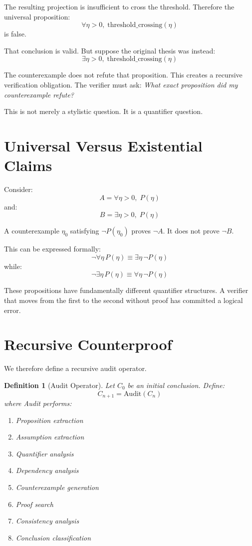 \documentclass[11pt,a4paper]{article}
\newtheorem{definition}[theorem]{Definition}
\begin{document}
The resulting projection is insufficient to cross the threshold. Therefore the universal proposition:
\[
\forall \eta > 0, \; \text{threshold\_crossing}(\eta)
\]
is false.

That conclusion is valid. But suppose the original thesis was instead:
\[
\exists \eta > 0, \; \text{threshold\_crossing}(\eta)
\]

The counterexample does not refute that proposition. This creates a recursive verification obligation. The verifier must ask: \textit{What exact proposition did my counterexample refute?}

This is not merely a stylistic question. It is a quantifier question.

\section{Universal Versus Existential Claims}

Consider:
\[
A = \forall \eta > 0, \; P(\eta)
\]
and:
\[
B = \exists \eta > 0, \; P(\eta)
\]

A counterexample $\eta_0$ satisfying $\neg P(\eta_0)$ proves $\neg A$. It does not prove $\neg B$.

This can be expressed formally:
\[
\neg \forall \eta \, P(\eta) \equiv \exists \eta \, \neg P(\eta)
\]
while:
\[
\neg \exists \eta \, P(\eta) \equiv \forall \eta \, \neg P(\eta)
\]

These propositions have fundamentally different quantifier structures. A verifier that moves from the first to the second without proof has committed a logical error.

\section{Recursive Counterproof}

We therefore define a recursive audit operator.

\begin{definition}[Audit Operator]
Let $C_0$ be an initial conclusion. Define:
\[
C_{n+1} = \text{Audit}(C_n)
\]
where Audit performs:
\begin{enumerate}
\item Proposition extraction
\item Assumption extraction
\item Quantifier analysis
\item Dependency analysis
\item Counterexample generation
\item Proof search
\item Consistency analysis
\item Conclusion classification
\end{enumerate}
\end{definition}
\end{document}
